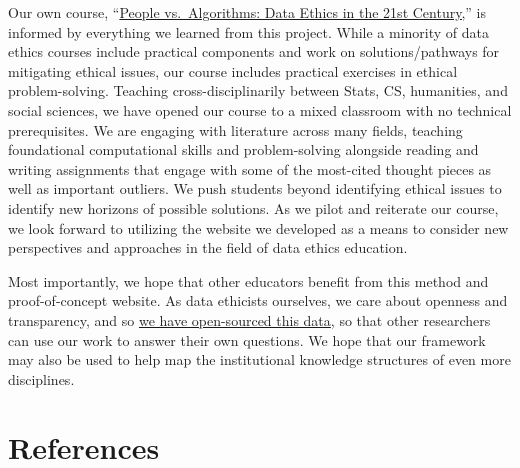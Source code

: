 \documentclass[
]{article}
\begin{document}
Our own course, ``\href{http://data-ethics.jonreeve.com/}{People
vs.~Algorithms: Data Ethics in the 21st Century,}'' is informed by
everything we learned from this project. While a minority of data ethics
courses include practical components and work on solutions/pathways for
mitigating ethical issues, our course includes practical exercises in
ethical problem-solving. Teaching cross-disciplinarily between Stats,
CS, humanities, and social sciences, we have opened our course to a
mixed classroom with no technical prerequisites. We are engaging with
literature across many fields, teaching foundational computational
skills and problem-solving alongside reading and writing assignments
that engage with some of the most-cited thought pieces as well as
important outliers. We push students beyond identifying ethical issues
to identify new horizons of possible solutions. As we pilot and
reiterate our course, we look forward to utilizing the website we
developed as a means to consider new perspectives and approaches in the
field of data ethics education.

Most importantly, we hope that other educators benefit from this method
and proof-of-concept website. As data ethicists ourselves, we care about
openness and transparency, and so
\href{https://github.com/JonathanReeve/data-ethics-literature-review}{we
have open-sourced this data}, so that other researchers can use our work
to answer their own questions. We hope that our framework may also be
used to help map the institutional knowledge structures of even more
disciplines.

\hypertarget{references}{%
\section{References}\label{references}}
\end{document}
